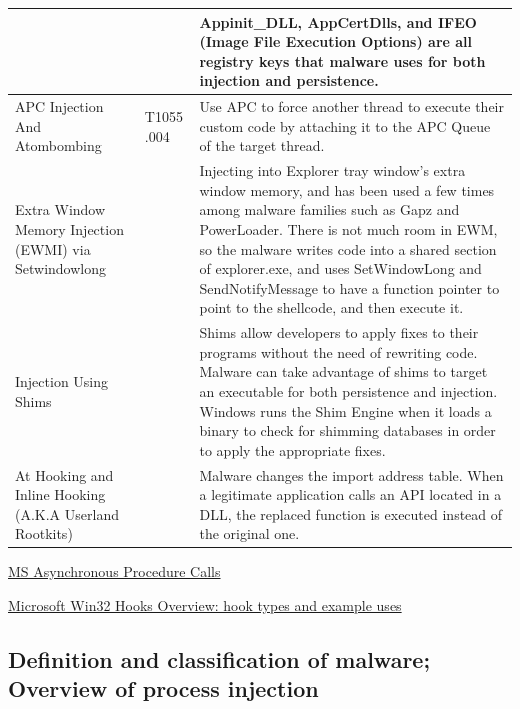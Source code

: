 \documentclass{article}
\begin{document}
\begin{table}[h!]
\begin{tabular}{ |p{3.5cm}||p{1.2cm}|p{10cm}|  }
        &
             & Appinit\_DLL, AppCertDlls, and IFEO (Image File Execution Options) are all registry keys that
               malware uses for both injection and persistence. \\
  \hline
  APC Injection And Atombombing
        & T1055 .004
             & Use APC to force another thread to execute their custom code by attaching it to the APC
               Queue of the target thread. \\
  \hline
  Extra Window Memory Injection (EWMI) via Setwindowlong
        &
             & Injecting into Explorer tray window’s extra window memory, and has been used a few times
               among malware families such as Gapz and PowerLoader. There is not much room in EWM, so the
               malware writes code into a shared section of explorer.exe, and uses SetWindowLong and
               SendNotifyMessage to have a function pointer to point to the shellcode, and then execute it. \\
  \hline
  Injection Using Shims
        &
             & Shims allow developers to apply fixes to their programs without the need of rewriting code.
               Malware can take advantage of shims to target an executable for both persistence and injection.
               Windows runs the Shim Engine when it loads a binary to check for shimming databases in order
              to apply the appropriate fixes. \\
  \hline
  At Hooking and Inline Hooking (A.K.A Userland Rootkits)
        &
            & Malware changes the import address table. When a legitimate application calls an API located
              in a DLL, the replaced function is executed instead of the original one. \\

  \hline
\end{tabular}
\label{table: ProcessInjectionTechniques}
\end{table}

\pagebreak

\href{https://learn.microsoft.com/en-gb/windows/win32/sync/asynchronous-procedure-calls}{MS Asynchronous Procedure Calls}

\href{https://learn.microsoft.com/en-gb/windows/win32/winmsg/about-hooks}{Microsoft Win32 Hooks Overview: hook types and example uses}


\subsection{Definition and classification of malware; Overview of process injection}
\end{document}
